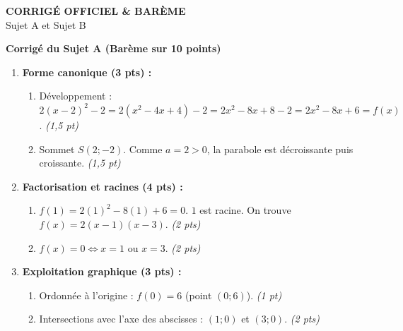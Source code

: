 \documentclass[11pt,a4paper]{article}
\newcommand{\partie}[1]{%
  \vspace{0.9em}%
  \noindent\textbf{#1}%
  \par\vspace{0.3em}%
}
\begin{document}
\newpage

\begin{center}
  {\LARGE \textbf{CORRIGÉ OFFICIEL \& BARÈME}}\\[0.4em]
  {\large Sujet A et Sujet B}
\end{center}

\partie{Corrigé du Sujet A (Barème sur 10 points)}
\begin{enumerate}
  \item \textbf{Forme canonique (3 pts) :}
  \begin{enumerate}
    \item Développement : $2(x - 2)^2 - 2 = 2(x^2 - 4x + 4) - 2 = 2x^2 - 8x + 8 - 2 = 2x^2 - 8x + 6 = f(x)$. \emph{(1,5 pt)}
    \item Sommet $S(2 ; -2)$. Comme $a = 2 > 0$, la parabole est décroissante puis croissante. \emph{(1,5 pt)}
  \end{enumerate}
  \item \textbf{Factorisation et racines (4 pts) :}
  \begin{enumerate}
    \item $f(1) = 2(1)^2 - 8(1) + 6 = 0$. $1$ est racine. On trouve $f(x) = 2(x - 1)(x - 3)$. \emph{(2 pts)}
    \item $f(x) = 0 \iff x = 1$ ou $x = 3$. \emph{(2 pts)}
  \end{enumerate}
  \item \textbf{Exploitation graphique (3 pts) :}
  \begin{enumerate}
    \item Ordonnée à l'origine : $f(0) = 6$ (point $(0 ; 6)$). \emph{(1 pt)}
    \item Intersections avec l'axe des abscisses : $(1 ; 0)$ et $(3 ; 0)$. \emph{(2 pts)}
  \end{enumerate}
\end{enumerate}
\end{document}
